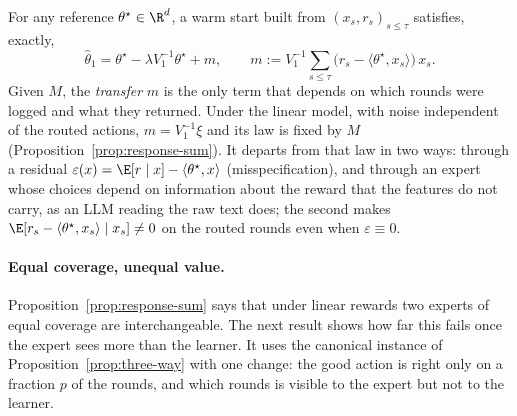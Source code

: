 

\begin{proposition}
\label{prop:transfer}
For any reference $\theta^\star\in\R^d$, a warm start built from
$(x_s,r_s)_{s\le\tau}$ satisfies, exactly,
\[
\widehat\theta_1=\theta^\star-\lambda V_1^{-1}\theta^\star+m,
\qquad
m:=V_1^{-1}\sum_{s\le\tau}\bigl(r_s-\langle\theta^\star,x_s\rangle\bigr)\,x_s .
\]
Given $M$, the \emph{transfer} $m$ is the only term that depends on which
rounds were logged and what they returned. Under the linear model, with noise
independent of the routed actions, $m=V_1^{-1}\xi$ and its law is fixed by $M$
(Proposition~\ref{prop:response-sum}). It departs from that law in two ways:
through a residual $\varepsilon(x)=\E[r\mid x]-\langle\theta^\star,x\rangle$
(misspecification), and through an expert whose choices depend on information
about the reward that the features do not carry, as an LLM reading the raw
text does; the second makes
$\E[r_s-\langle\theta^\star,x_s\rangle\mid x_s]\ne0$ on the routed rounds even
when $\varepsilon\equiv0$.
\end{proposition}


\paragraph{Equal coverage, unequal value.}
Proposition~\ref{prop:response-sum} says that under linear rewards two experts
of equal coverage are interchangeable. The next result shows how far this
fails once the expert sees more than the learner. It uses the canonical
instance of Proposition~\ref{prop:three-way} with one change: the good action
is right only on a fraction $p$ of the rounds, and which rounds is visible to
the expert but not to the learner.


